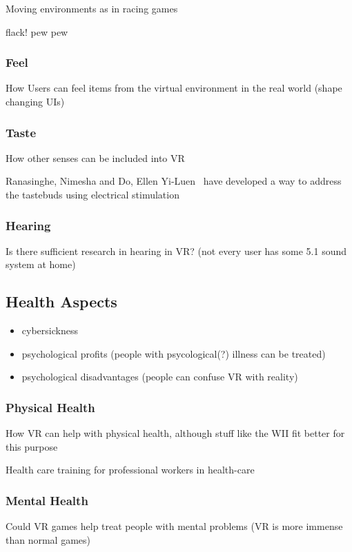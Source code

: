 Moving environments as in racing games

flack! pew pew

\subsubsection{Feel}
How Users can feel items from the virtual environment in the real world (shape changing UIs)

\subsubsection{Taste}
How other senses can be included into VR

Ranasinghe, Nimesha and Do, Ellen Yi-Luen~\cite{Ranasinghe:2016:VSS:2984751.2985729} have developed a way to address the tastebuds using electrical stimulation


\subsubsection{Hearing}
Is there sufficient research in hearing in VR? (not every user has some 5.1 sound system at home)

\subsection{Health Aspects}

\begin{itemize}
	\item cybersickness
	\item psychological profits (people with psycological(?) illness can be treated)
	\item psychological disadvantages (people can confuse VR with reality)
\end{itemize}

\subsubsection{Physical Health}
How VR can help with physical health, although stuff like the WII fit better for this purpose

Health care training for professional workers in health-care

\subsubsection{Mental Health}
Could VR games help treat people with mental problems (VR is more immense than normal games)

